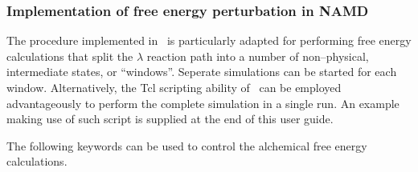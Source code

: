 \subsubsection{Implementation of free energy perturbation in NAMD}


The procedure implemented in \NAMD\ is particularly
adapted for performing free 
energy calculations that split the $\lambda$
reaction path into a number of non--physical,
intermediate states, or ``windows''. Seperate simulations 
can be started for each window.
Alternatively, the {\sc Tcl} scripting ability of 
\NAMD\ can be employed advantageously
to perform the complete simulation in a single run.
An example making use of such script is supplied at the end 
of this user guide.


The following keywords can be used to control the alchemical free 
energy calculations. 

